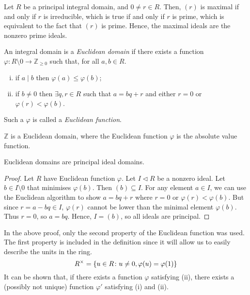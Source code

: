 \begin{remark}
	Let \( R \) be a principal integral domain, and \( 0 \neq r \in R \).
	Then, \( (r) \) is maximal if and only if \( r \) is irreducible, which is true if and only if \( r \) is prime, which is equivalent to the fact that \( (r) \) is prime.
	Hence, the maximal ideals are the nonzero prime ideals.
\end{remark}
\begin{definition}
	An integral domain is a \textit{Euclidean domain} if there exists a function \( \varphi \colon R \setminus \qty{0} \to \mathbb Z_{\geq 0} \) such that, for all \( a, b \in R \).
	\begin{enumerate}[(i)]
		\item if \( a \mid b \) then \( \varphi(a) \leq \varphi(b) \);
		\item if \( b \neq 0 \) then \( \exists q, r \in R \) such that \( a = bq + r \) and either \( r = 0 \) or \( \varphi(r) < \varphi(b) \).
	\end{enumerate}
	Such a \( \varphi \) is called a \textit{Euclidean function}.
\end{definition}
\begin{example}
	\( \mathbb Z \) is a Euclidean domain, where the Euclidean function \( \varphi \) is the absolute value function.
\end{example}
\begin{proposition}
	Euclidean domains are principal ideal domains.
\end{proposition}
\begin{proof}
	Let \( R \) have Euclidean function \( \varphi \).
	Let \( I \triangleleft R \) be a nonzero ideal.
	Let \( b \in I \setminus \qty{0} \) that minimises \( \varphi(b) \).
	Then \( (b) \subseteq I \).
	For any element \( a \in I \), we can use the Euclidean algorithm to show \( a = bq + r \) where \( r = 0 \) or \( \varphi(r) < \varphi(b) \).
	But since \( r = a - bq \in I \), \( \varphi(r) \) cannot be lower than the minimal element \( \varphi(b) \).
	Thus \( r = 0 \), so \( a = bq \).
	Hence, \( I = (b) \), so all ideals are principal.
\end{proof}
\begin{remark}
	In the above proof, only the second property of the Euclidean function was used.
	The first property is included in the definition since it will allow us to easily describe the units in the ring.
	\[ R^\times = \qty{u \in R \colon u \neq 0, \varphi(u) = \varphi(1)} \]
	It can be shown that, if there exists a function \( \varphi \) satisfying (ii), there exists a (possibly not unique) function \( \varphi' \) satisfying (i) and (ii).
\end{remark}
